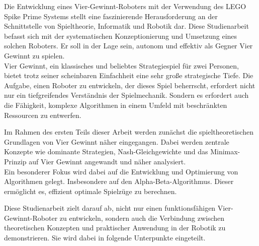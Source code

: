 Die Entwicklung eines Vier-Gewinnt-Roboters mit der Verwendung des LEGO Spike Prime Systems stellt eine faszinierende Herausforderung an der Schnittstelle von Spieltheorie, Informatik und Robotik dar. Diese Studienarbeit befasst sich mit der systematischen Konzeptionierung und Umsetzung eines solchen Roboters. Er soll in der Lage sein, autonom und effektiv als Gegner Vier Gewinnt zu spielen. \\
Vier Gewinnt, ein klassisches und beliebtes Strategiespiel für zwei Personen, bietet trotz seiner scheinbaren Einfachheit eine sehr große strategische Tiefe.
Die Aufgabe, einen Roboter zu entwickeln, der dieses Spiel beherrscht, erfordert nicht nur ein tiefgreifendes Verständnis der Spielmechanik. Sondern es erfordert auch die Fähigkeit, komplexe Algorithmen in einem  Umfeld  mit beschränkten Ressourcen zu entwerfen.

Im Rahmen des ersten Teils dieser Arbeit werden zunächst die spieltheoretischen Grundlagen von Vier Gewinnt näher eingegangen. Dabei werden zentrale Konzepte wie dominante Strategien, Nash-Gleichgewichte und das Minimax-Prinzip auf Vier Gewinnt angewandt und näher analysiert.\\
Ein besonderer Fokus wird dabei auf die Entwicklung und Optimierung von Algorithmen gelegt. Insbesondere auf den Alpha-Beta-Algorithmus. Dieser ermöglicht es, effizient optimale Spielzüge zu berechnen.

Diese Studienarbeit zielt darauf ab, nicht nur einen funktionsfähigen Vier-Gewinnt-Roboter zu entwickeln, sondern auch die Verbindung zwischen theoretischen Konzepten und praktischer Anwendung in der Robotik zu demonstrieren. Sie wird dabei in folgende Unterpunkte eingeteilt.

\newpage

